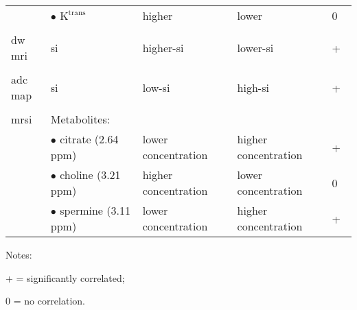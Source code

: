\begin{landscape}
\begin{table}
\begin{threeparttable}
\begin{tabularx}{\linewidth}{@{} l X X X l @{}}
        & $\bullet$ $\text{K}^{\text{trans}}$ & higher & lower & 0 \\ \\
        \acs*{dw} \acs*{mri} & \acs*{si} & higher-\acs*{si}~\cite{Huisman2003,Barentsz2012} & lower-\acs*{si}~\cite{Huisman2003,Barentsz2012} & + \\ \\ 
        \acs*{adc} map & \acs*{si} & low-\acs*{si}~\cite{Barentsz2012} & high-\acs*{si}~\cite{Barentsz2012} & +~\cite{Hambrock2011, Itou2011, Peng2013} \\ \\
        \acs*{mrsi}& Metabolites: & & & \\
        & $\bullet$ citrate (2.64 ppm)~\cite{Verma2010} & lower concentration~\cite{Awwad2012,Costello2006,Graaf2000} & higher concentration~\cite{Awwad2012,Costello2006,Graaf2000} & +~\cite{Giskeodegard2013} \\
        & $\bullet$ choline (3.21 ppm)~\cite{Verma2010} & higher concentration~\cite{Awwad2012,Costello2006,Graaf2000} & lower concentration~\cite{Awwad2012,Costello2006,Graaf2000} & 0~\cite{Giskeodegard2013} \\
        & $\bullet$ spermine (3.11 ppm)~\cite{Verma2010} & lower concentration~\cite{Awwad2012,Costello2006,Graaf2000} & higher concentration~\cite{Awwad2012,Costello2006,Graaf2000} & +~\cite{Giskeodegard2013} \\
        \bottomrule
      \end{tabularx}
      \begin{tablenotes}
      \item Notes:
      \item + = significantly correlated;
      \item 0 = no correlation.
      \end{tablenotes}
    \end{threeparttable}
  \label{tab:modmri}
\end{table}
\end{landscape}